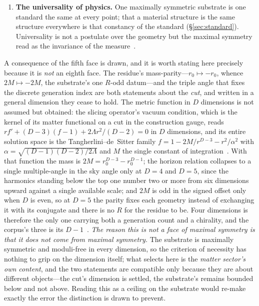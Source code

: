 \documentclass[11pt,a4paper]{article}
\theoremstyle{definition}
\begin{document}
\begin{enumerate}
Maximal symmetry is why there is one such circle and not a family of them, and why $\alpha$ is the one length the exhausted isometry leaves to set it: the lines, the curvature, the placement, the count, and the passage are all read off the same waist.
\item \textbf{The universality of physics.} One maximally symmetric
substrate is one standard the same at every point; that a material structure
is the same structure everywhere is that constancy of the standard
(\S\ref{sec:standard}). Universality is not a postulate over the geometry but
the maximal symmetry read as the invariance of the
measure~\cite{JanzenThesis,JanzenModernParallax}.
\end{enumerate}

A consequence of the fifth face is drawn, and it is worth stating here precisely because it is
\emph{not} an eighth face. The residue's mass-parity---$r_{0}\mapsto-r_{0}$, whence $2M\mapsto-2M$, the
substrate's one $R$-odd datum---and the triple angle that fixes the discrete generation index are both
statements about the \emph{cut}, and written in a general dimension they cease to hold. The metric function in $D$ dimensions is not assumed but obtained: the slicing operator's vacuum condition, which is the kernel of its matter functional on a cut in the construction gauge, reads $rf'+(D-3)(f-1)+2\Lambda r^{2}/(D-2)=0$ in $D$ dimensions, and its entire solution space is the Tangherlini--de~Sitter family $f=1-2M/r^{D-3}-r^{2}/\alpha^{2}$ with $\alpha=\sqrt{(D-1)(D-2)/2\Lambda}$ and $M$ the single constant of integration~\cite{JanzenSlicing}. With that function the mass is
$2M=r_{0}^{D-3}-r_{0}^{D-1}$; the horizon relation collapses to a single multiple-angle in the sky angle only
at $D=4$ and $D=5$, since the harmonics standing below the top one number two or more from six dimensions
upward against a single available scale; and $2M$ is odd in the signed offset only when $D$ is
even, so at $D=5$ the parity fixes each geometry instead of exchanging it with its conjugate and there is no
$R$ for the residue to be. Four dimensions is therefore the only one carrying both a generation count and a
chirality, and the corpus's three is its $D-1$~\cite{JanzenSlicing,JanzenMatter}. \emph{The reason this is not
a face of maximal symmetry is that it does not come from maximal symmetry.} The substrate is maximally
symmetric and moduli-free in every dimension, so the criterion of necessity has nothing to grip on the
dimension itself; what selects here is the \emph{matter sector's own content}, and the two statements are
compatible only because they are about different objects---the cut's dimension is settled, the substrate's
remains bounded below and not above. Reading this as a ceiling on the substrate would re-make exactly the
error the distinction is drawn to prevent.
\end{document}
